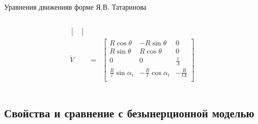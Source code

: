 \begin{frame}{Уравнения движения}{в форме Я.В. Татаринова}
\begin{columns}
\begin{column}{0.6\textwidth}
\begin{eqnarray*}
\begin{bmatrix}
                    \end{bmatrix} \\
                \mathring{V} & = &
                    \begin{bmatrix}
                        R\cos\theta & -R\sin\theta & 0 \\
                        R\sin\theta & R\cos\theta  & 0 \\
                        0           & 0            & \frac{1}{\Lambda} \\
                        \frac{R}{l}\sin\alpha_i & -\frac{R}{l}\cos\alpha_i & -\frac{R}{l\Lambda} \\
                    \end{bmatrix}
            \end{eqnarray*}
        \end{column}
    \end{columns}
\end{frame}

\subsection{Свойства и сравнение с безынерционной моделью}

